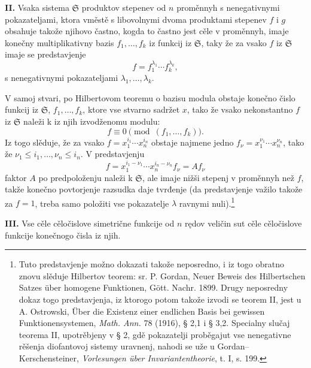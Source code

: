 \documentclass[11pt]{article}
\providecommand{\frS}{\mathfrak S}
\begin{document}
\textbf{II.} Vsaka sistema \(\frS\) produktov stepenev od \(n\) proměnnyh s nenegativnymi pokazateljami, ktora vměstě s libovolnymi dvoma produktami stepenev \(f\) i \(g\) obsahuje takože njihovo častno, kogda to častno jest cěle v proměnnyh, imaje konečny multiplikativny bazis \(f_1,\ldots,f_k\) iz funkcij iz \(\frS\), taky že za vsako \(f\) iz \(\frS\) imaje se predstavjenje
\[
        f=f_1^{\lambda_1}\cdots f_k^{\lambda_k},
\]
s nenegativnymi pokazateljami \(\lambda_1,\ldots,\lambda_k\).

V samoj stvari, po Hilbertovom teoremu o bazisu modula obstaje konečno čislo funkcij iz \(\frS\), \(f_1,\ldots,f_k\), ktore vse stvarno sadržet \(x\), tako že vsako nekonstantno \(f\) iz \(\frS\) naleži k iz njih izvodženomu modulu:
\[
        f\equiv0\pmod{(f_1,\ldots,f_k)}.
\]
Iz togo slěduje, že za vsako \(f=x_1^{i_1}\cdots x_n^{i_n}\) obstaje najmene jedno \(f_\nu=x_1^{\nu_1}\cdots x_n^{\nu_n}\), tako že \(\nu_1\le i_1,\ldots,\nu_n\le i_n\). V predstavjenju
\[
        f=x_1^{i_1-\nu_1}\cdots x_n^{i_n-\nu_n} f_\nu = A f_\nu
\]
faktor \(A\) po predpoloženju naleži k \(\frS\), ale imaje nižši stepenj v proměnnyh než \(f\), takže konečno povtorjenje razsudka daje tvrđenje (da predstavjenje važilo takože za \(f=1\), treba samo položiti vse pokazatelje \(\lambda\) ravnymi nuli).\footnote{Tuto predstavjenje možno dokazati takože neposredno, i iz togo obratno znovu slěduje Hilbertov teorem: sr. P. Gordan, Neuer Beweis des Hilbertschen Satzes über homogene Funktionen, Gött. Nachr. 1899. Drugy neposredny dokaz togo predstavjenja, iz ktorogo potom takože izvodi se teorem II, jest u A. Ostrowski, Über die Existenz einer endlichen Basis bei gewissen Funktionensystemen, \emph{Math. Ann.} 78 (1916), § 2,1 i § 3,2. Specialny slučaj teorema II, upotrěbjeny v § 2, gdě pokazatelji proběgajut vse nenegativne rěšenja diofantovoj sistemy uravnenj, nahodi se uže u Gordan--Kerschensteiner, \emph{Vorlesungen über Invariantentheorie}, t. I, s. 199.}

\textbf{III.} Vse cěle cěločislove simetrične funkcije od \(n\) rędov veličin sut cěle cěločislove funkcije konečnogo čisla iz njih.
\end{document}
